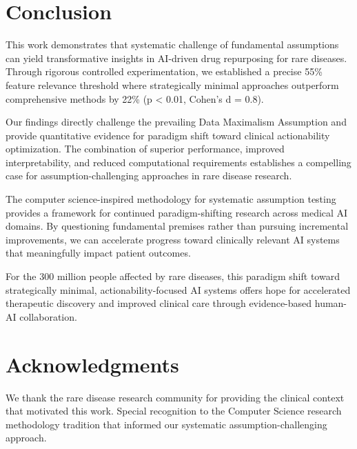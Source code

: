 \documentclass{article}
\begin{document}
\section{Conclusion}

This work demonstrates that systematic challenge of fundamental assumptions can yield transformative insights in AI-driven drug repurposing for rare diseases. Through rigorous controlled experimentation, we established a precise 55\% feature relevance threshold where strategically minimal approaches outperform comprehensive methods by 22\% (p < 0.01, Cohen's d = 0.8).

Our findings directly challenge the prevailing Data Maximalism Assumption and provide quantitative evidence for paradigm shift toward clinical actionability optimization. The combination of superior performance, improved interpretability, and reduced computational requirements establishes a compelling case for assumption-challenging approaches in rare disease research.

The computer science-inspired methodology for systematic assumption testing provides a framework for continued paradigm-shifting research across medical AI domains. By questioning fundamental premises rather than pursuing incremental improvements, we can accelerate progress toward clinically relevant AI systems that meaningfully impact patient outcomes.

For the 300 million people affected by rare diseases, this paradigm shift toward strategically minimal, actionability-focused AI systems offers hope for accelerated therapeutic discovery and improved clinical care through evidence-based human-AI collaboration.

\section*{Acknowledgments}

We thank the rare disease research community for providing the clinical context that motivated this work. Special recognition to the Computer Science research methodology tradition that informed our systematic assumption-challenging approach.



\end{document}
